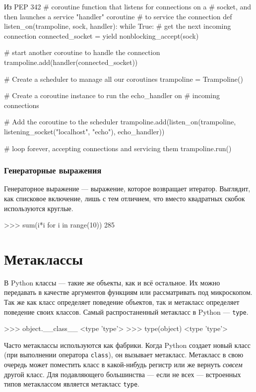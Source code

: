 \begin{pylst}{Из PEP 342}{}
# coroutine function that listens for connections on a
# socket, and then launches a service "handler" coroutine
# to service the connection
def listen_on(trampoline, sock, handler):
    while True:
        # get the next incoming connection
        connected_socket = yield nonblocking_accept(sock)

        # start another coroutine to handle the connection
        trampoline.add(handler(connected_socket))

# Create a scheduler to manage all our coroutines
trampoline = Trampoline()

# Create a coroutine instance to run the echo_handler on
# incoming connections

# Add the coroutine to the scheduler
trampoline.add(listen_on(trampoline,
                         listening_socket("localhost", "echo"),
                         echo_handler))

# loop forever, accepting connections and servicing them
trampoline.run()
\end{pylst}

\subsubsection{Генераторные выражения}
Генераторное выражение --- выражение, которое возвращает итератор. Выглядит, как списковое включение, лишь с тем отличием, что вместо квадратных скобок используются круглые.
\begin{pylst}{}{}
>>> sum(i*i for i in range(10))
285
\end{pylst}

\section{Метаклассы}
В Python классы --- такие же объекты, как и всё остальное. Их можно передавать в качестве аргументов функциям или рассматривать под микроскопом. Так же как класс определяет поведение объектов, так и метакласс определяет поведение своих классов. Самый распростаненный метакласс в Python --- \lstinline{type}.

\begin{pylst}{}{}
>>> object.__class__
<type 'type'>
>>> type(object)
<type 'type'>
\end{pylst}

Часто метаклассы используются как фабрики. Когда Python создает новый класс (при выполнении оператора \lstinline{class}), он вызывает метакласс. Метакласс в свою очередь может поместить класс в какой-нибудь регистр или же вернуть \emph{совсем} другой класс. Для подавляющего большинства --- если не всех --- встроенных типов метаклассом является метакласс \lstinline{type}.

